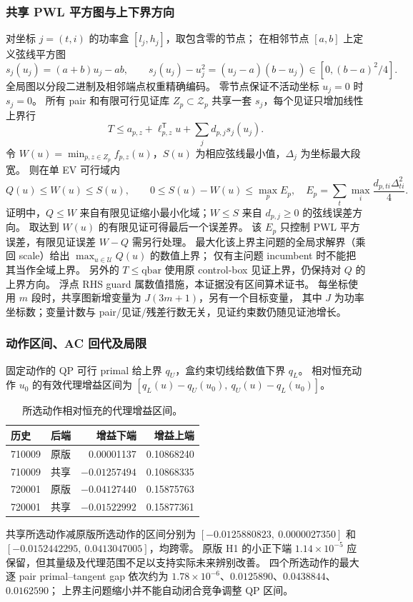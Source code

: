 \documentclass[UTF8,fontset=fandol,11pt,a4paper]{ctexart}
\begin{document}
\subsubsection{共享 PWL 平方图与上下界方向}
对坐标 $j=(t,i)$ 的功率盒 $[l_j,h_j]$，取包含零的节点；
在相邻节点 $[a,b]$ 上定义弦线平方图
\begin{equation}
 s_j(u_j)=(a+b)u_j-ab,
 \qquad s_j(u_j)-u_j^2=(u_j-a)(b-u_j)\in[0,(b-a)^2/4].
\end{equation}
全局图以分段二进制及相邻端点权重精确编码。
零节点保证不活动坐标 $u_j=0$ 时 $s_j=0$。
所有 pair 和有限可行见证库 $Z_p\subset\mathcal Z_p$ 共享一套 $s_j$，每个见证只增加线性上界行
\begin{equation}
 T\le a_{p,z}+\ell_{p,z}^{\mathsf T}u+\sum_jd_{p,j}s_j(u_j).
\end{equation}
令 $W(u)=\min_{p,z\in Z_p}f_{p,z}(u)$，$S(u)$ 为相应弦线最小值，$\Delta_j$ 为坐标最大段宽。
则在单 EV 可行域内
\begin{equation}
 Q(u)\le W(u)\le S(u),\qquad
 0\le S(u)-W(u)\le\max_p E_p,
 \quad E_p=\sum_t\max_i\frac{d_{p,ti}\Delta_{ti}^2}{4}.
\end{equation}
证明中，$Q\le W$ 来自有限见证缩小最小化域；$W\le S$ 来自 $d_{p,j}\ge0$ 的弦线误差方向。
取达到 $W(u)$ 的有限见证可得最后一个误差界。
该 $E_p$ 只控制 PWL 平方误差，有限见证误差 $W-Q$ 需另行处理。
最大化该上界主问题的全局求解界（乘回 scale）给出 $\max_{u\in\mathcal U}Q(u)$ 的数值上界；
仅有主问题 incumbent 时不能把其当作全域上界。
另外的 $T\le\mathrm{qbar}$ 使用原 control-box 见证上界，仍保持对 $Q$ 的上界方向。
浮点 RHS guard 属数值措施，本证据没有区间算术证书。
每坐标使用 $m$ 段时，共享图新增变量为 $J(3m+1)$，另有一个目标变量，
其中 $J$ 为功率坐标数；变量计数与 pair/见证/残差行数无关，见证约束数仍随见证池增长。

\subsubsection{动作区间、AC 回代及局限}
固定动作的 QP 可行 primal 给上界 $q_U$，盒约束切线给数值下界 $q_L$。
相对恒充动作 $u_0$ 的有效代理增益区间为
$[q_L(u)-q_U(u_0),\ q_U(u)-q_L(u_0)]$。
\begin{table}[htbp]
\centering\small
\caption{所选动作相对恒充的代理增益区间。}
\label{tab:shared-upper-gain}
\begin{tabular}{llrr}
\hline
历史 & 后端 & 增益下端 & 增益上端 \\
\hline
710009 & 原版 & 0.00001137 & 0.10868240 \\
710009 & 共享 & $-0.01257494$ & 0.10868335 \\
720001 & 原版 & $-0.04127440$ & 0.15875763 \\
720001 & 共享 & $-0.01522992$ & 0.15877361 \\
\hline
\end{tabular}
\end{table}
共享所选动作减原版所选动作的区间分别为
$[-0.0125880823,\ 0.0000027350]$ 和 $[-0.0152442295,\ 0.0413047005]$，均跨零。
原版 H1 的小正下端 $1.14\times10^{-5}$ 应保留，但其量级及代理范围不足以支持实际未来辨别改善。
四个所选动作的最大逐 pair primal--tangent gap 依次约为
$1.78\times10^{-6}$、$0.0125890$、$0.0438844$、$0.0162590$；
上界主问题缩小并不能自动闭合竞争调整 QP 区间。
\end{document}
